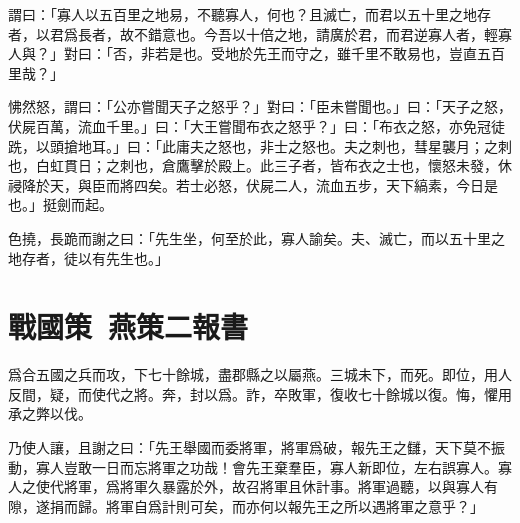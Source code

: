 謂曰：「寡人以五百里之地易，不聽寡人，何也？且滅亡，而君以五十里之地存者，以君爲長者，故不錯意也。今吾以十倍之地，請廣於君，而君逆寡人者，輕寡人與？」對曰：「否，非若是也。受地於先王而守之，雖千里不敢易也，豈直五百里哉？」

怫然怒，謂曰：「公亦嘗聞天子之怒乎？」對曰：「臣未嘗聞也。」曰：「天子之怒，伏屍百萬，流血千里。」曰：「大王嘗聞布衣之怒乎？」曰：「布衣之怒，亦免冠徒跣，以頭搶地耳。」曰：「此庸夫之怒也，非士之怒也。夫之刺也，彗星襲月；之刺也，白虹貫日；之刺也，倉鷹擊於殿上。此三子者，皆布衣之士也，懷怒未發，休祲降於天，與臣而將四矣。若士必怒，伏屍二人，流血五步，天下縞素，今日是也。」挺劍而起。

色撓，長跪而謝之曰：「先生坐，何至於此，寡人諭矣。夫、滅亡，而以五十里之地存者，徒以有先生也。」

\theendnotes

\section[樂毅報燕王書\quad{\small 戰國策\ 燕策二}]{{\normalsize 戰國策\ 燕策二}\quad {}報書}
爲合五國之兵而攻，下七十餘城，盡郡縣之以屬燕。三城未下，而死。即位，用人反間，疑，而使代之將。奔，封以爲。詐，卒敗軍，復收七十餘城以復。悔，懼用承之弊以伐。

乃使人讓，且謝之曰：「先王舉國而委將軍，將軍爲破，報先王之讎，天下莫不振動，寡人豈敢一日而忘將軍之功哉！會先王棄羣臣，寡人新即位，左右誤寡人。寡人之使代將軍，爲將軍久暴露於外，故召將軍且休計事。將軍過聽，以與寡人有隙，遂捐而歸。將軍自爲計則可矣，而亦何以報先王之所以遇將軍之意乎？」

